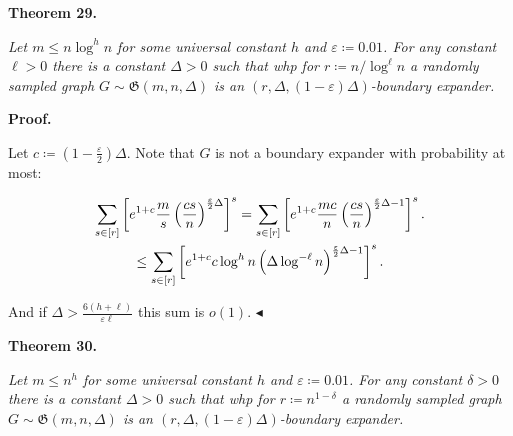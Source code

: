 \documentclass[10pt,a4paper]{article}
\begin{document}
\par\medskip\noindent\textbf{
\textbf{Theorem 29}\textbf{.}
}\par



\emph{Let $m\leq n\log^{h}n$ for some universal constant $h$ and $\varepsilon\coloneqq 0.01$. For any
constant $\ell>0$ there is a constant $\Delta>0$ such that whp for $r\coloneqq n/\log^{\ell}n$ a randomly sampled graph $G\sim\mathfrak{G}(m,n,\Delta)$ is an $(r,\Delta,(1-\varepsilon)\Delta)$-boundary expander.}\par







\par\medskip\noindent\textbf{Proof.}\par




Let $c\coloneqq(1-\frac{\varepsilon}{2})\Delta$. Note that $G$ is not a boundary expander with
probability at most:\par


\[\begin{gathered}
\displaystyle\sum\limits_{s\in[r]}\left[e^{1+c}\frac{m}{s}\left(\frac{cs}{n}%
\right)^{\frac{\varepsilon}{2}\Delta}\right]^{s} \displaystyle=\sum\limits_{s\in[r]}\left[e^{1+c}\frac{mc}{n}\left(\frac{cs}{n}%
\right)^{\frac{\varepsilon}{2}\Delta-1}\right]^{s}. \\
\displaystyle\leq\sum\limits_{s\in[r]}\left[e^{1+c}c\log^{h}n\left(\Delta\log^%
{-\ell}n\right)^{\frac{\varepsilon}{2}\Delta-1}\right]^{s}.
\end{gathered}\]


And if $\Delta>\frac{6(h+\ell)}{\varepsilon\ell}$ this sum is $o(1)$.
$\blacktriangleleft$\par





\par\medskip\noindent\textbf{
\textbf{Theorem 30}\textbf{.}
}\par



\emph{Let $m\leq n^{h}$ for some universal constant $h$ and $\varepsilon\coloneqq 0.01$. For any constant
$\delta>0$ there is a constant $\Delta>0$ such that whp for $r\coloneqq n^{1-\delta}$ a
randomly sampled graph $G\sim\mathfrak{G}(m,n,\Delta)$ is an $(r,\Delta,(1-\varepsilon)\Delta)$-boundary expander.}\par
\end{document}
